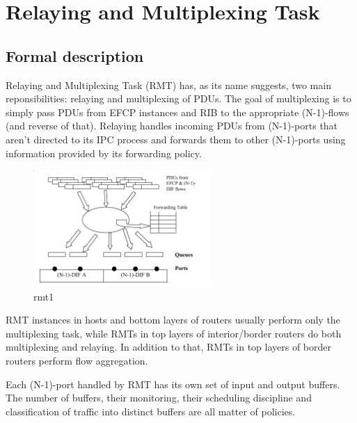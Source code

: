     \section{Relaying and Multiplexing Task}

        \subsection{Formal description}

            Relaying and Multiplexing Task (RMT) has, as its name suggests, two main reponsibilities: relaying and multiplexing of PDUs. The goal of multiplexing is to simply pass PDUs from EFCP instances and RIB to the appropriate (N-1)-flows (and reverse of that). Relaying handles incoming PDUs from (N-1)-ports that aren't directed to its IPC process and forwards them to other (N-1)-ports using information provided by its forwarding policy.

            \begin{figure}[H]
                \begin{center}
                    \includegraphics[width=0.6\textwidth]{fig/rmt_insides.png}
                  \caption{rmt1}
                  \label{rmt1}
                \end{center}
            \end{figure}

            RMT instances in hosts and bottom layers of routers usually perform only the multiplexing task, while RMTs in top layers of interior/border routers do both multiplexing and relaying. In addition to that, RMTs in top layers of border routers perform flow aggregation.

            \vspace{300pt}

            Each (N-1)-port handled by RMT has its own set of input and output buffers. The number of buffers, their monitoring, their scheduling discipline and classification of traffic into distinct buffers are all matter of policies.

